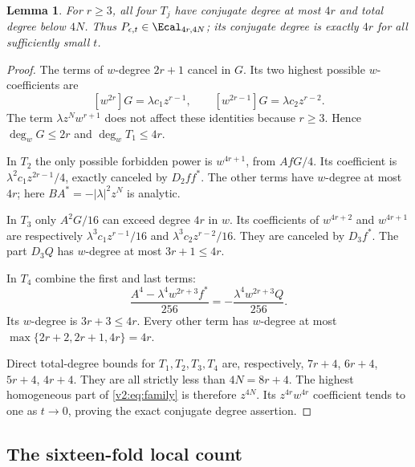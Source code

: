 \documentclass[UTF8,11pt]{ctexart}
\newtheorem{lem}[thm]{Lemma}
\theoremstyle{definition}
\numberwithin{equation}{section}
\begin{document}
\begin{lem}\label{v2:lem:degrees}
For $r\ge3$, all four $T_j$ have conjugate degree at most $4r$ and
total degree below $4N$. Thus $P_{\epsilon,t}\in\Ecal_{4r,4N}$;
its conjugate degree is exactly $4r$ for all sufficiently small $t$.
\end{lem}
\begin{proof}
The terms of $w$-degree $2r+1$ cancel in $G$. Its two highest
possible $w$-coefficients are
\[
 [w^{2r}]G=\lambda c_1z^{r-1},\qquad
 [w^{2r-1}]G=\lambda c_2z^{r-2}.
\]
The term $\lambda z^Nw^{r+1}$ does not affect these identities because
$r\ge3$. Hence $\deg_wG\le2r$ and $\deg_wT_1\le4r$.

In $T_2$ the only possible forbidden power is $w^{4r+1}$, from
$AfG/4$. Its coefficient is
$\lambda^2c_1z^{2r-1}/4$, exactly canceled by $D_2ff^*$.
The other terms have $w$-degree at most $4r$; here
$BA^*=-|\lambda|^2z^N$ is analytic.

In $T_3$ only $A^2G/16$ can exceed degree $4r$ in $w$.
Its coefficients of $w^{4r+2}$ and $w^{4r+1}$ are respectively
$\lambda^3c_1z^{r-1}/16$ and $\lambda^3c_2z^{r-2}/16$.
They are canceled by $D_3f^*$. The part $D_3Q$ has $w$-degree at
most $3r+1\le4r$.

In $T_4$ combine the first and last terms:
\[
 \frac{A^4-\lambda^4w^{2r+3}f^*}{256}
       =-\frac{\lambda^4w^{2r+3}Q}{256}.
\]
Its $w$-degree is $3r+3\le4r$. Every other term has $w$-degree
at most $\max\{2r+2,2r+1,4r\}=4r$.

Direct total-degree bounds for $T_1,T_2,T_3,T_4$ are, respectively,
$7r+4$, $6r+4$, $5r+4$, $4r+4$. They are all strictly less than
$4N=8r+4$. The highest homogeneous part of \eqref{v2:eq:family} is
therefore $z^{4N}$. Its $z^{4r}w^{4r}$ coefficient tends to one as
$t\to0$, proving the exact conjugate degree assertion.
\end{proof}

\subsection{The sixteen-fold local count}
\end{document}
